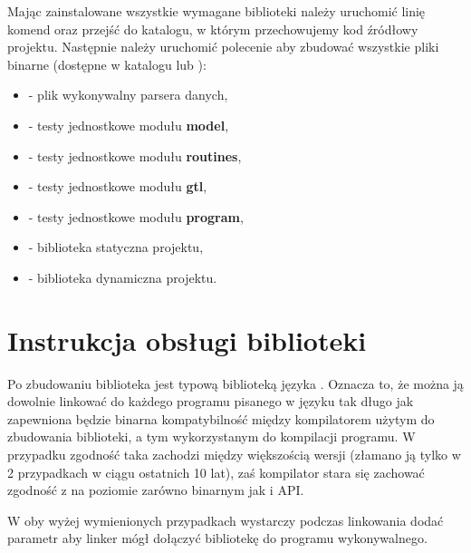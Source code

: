 \documentclass[polish]{standalone}
\begin{document}
Mając zainstalowane wszystkie wymagane biblioteki należy uruchomić linię komend oraz przejść do katalogu, w którym
przechowujemy kod źródłowy projektu. Następnie należy uruchomić polecenie  aby zbudować wszystkie pliki
binarne (dostępne w katalogu  lub ):
\begin{itemize}
\item {} - plik wykonywalny parsera danych,
\item {} - testy jednostkowe modułu \textbf{model},
\item {} - testy jednostkowe modułu \textbf{routines},
\item {} - testy jednostkowe modułu \textbf{gtl},
\item {} - testy jednostkowe modułu \textbf{program},
\item {} - biblioteka statyczna projektu,
\item {} - biblioteka dynamiczna projektu.
\end{itemize}

\chapter{Instrukcja obsługi biblioteki}

Po zbudowaniu biblioteka jest typową biblioteką języka . Oznacza to, że można ją dowolnie linkować do każdego
programu pisanego w języku  tak długo jak zapewniona będzie binarna kompatybilność między kompilatorem użytym
do zbudowania biblioteki, a tym wykorzystanym do kompilacji programu. W przypadku  zgodność taka zachodzi
między większością wersji (złamano ją tylko w 2 przypadkach w ciągu ostatnich 10 lat), zaś kompilator  stara
się zachować zgodność z  na poziomie zarówno binarnym jak i API.

W oby wyżej wymienionych przypadkach wystarczy podczas linkowania dodać parametr 
aby linker mógł dołączyć bibliotekę do programu wykonywalnego.
\end{document}

